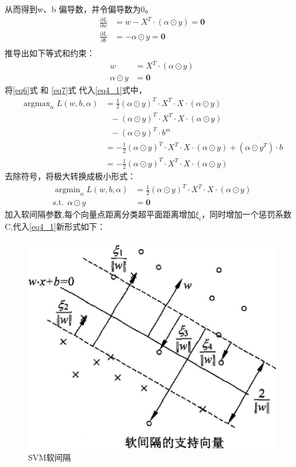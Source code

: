 \documentclass[12pt, a4paper, oneside]{ctexart}
\begin{document}
从而得到w、b 偏导数，并令偏导数为0。
\begin{align}
    \frac{\partial L}{\partial w} &= w - X^T\cdot(\alpha \odot y) = \boldsymbol{0}\nonumber \\
    \frac{\partial L}{\partial b} &= - \alpha \odot y \nonumber = \boldsymbol{0}\\
\end{align}
推导出如下等式和约束：
\begin{align}
    w &= X^T\cdot(\alpha \odot y) \label{eq6} \\
    \alpha \odot y &= \boldsymbol{0} \label{eq7}
\end{align}
将\eqref{eq6}式 和 \eqref{eq7}式 代入\eqref{eq4_1}式中，
\begin{align}
    \mathop{\arg\max}_{\alpha} L(w, b, {\alpha}) &= \frac{1}{2}(\alpha \odot y)^T \cdot X^T \cdot X \cdot (\alpha \odot y) \nonumber \\
                      & \ \ \  - (\alpha \odot y)^T \cdot X^T \cdot X \cdot (\alpha \odot y) \nonumber \\
                      & \ \ \  - (\alpha \odot y)^T \cdot b^m  \nonumber \\
                      &= -\frac{1}{2}(\alpha \odot y)^T \cdot X^T \cdot X \cdot (\alpha \odot y) + (\alpha \odot y^T) \cdot b \nonumber \\
                      &= -\frac{1}{2}(\alpha \odot y)^T \cdot X^T \cdot X \cdot (\alpha \odot y) \nonumber 
\end{align}
去除符号，将极大转换成极小形式：
\begin{align}
    \mathop{\arg\min}_{\alpha} L(w, b, {\alpha}) &= \frac{1}{2}(\alpha \odot y)^T \cdot X^T \cdot X \cdot (\alpha \odot y) \label{eq9} \\
        \mathrm{ s.t. }\ \   \alpha \odot y &= \boldsymbol{0} \nonumber 
\end{align}
加入软间隔参数,每个向量点距离分类超平面距离增加$\xi_i$，同时增加一个惩罚系数C,代入\eqref{eq4_1}新形式如下：
\begin{figure}[htbp]
    \centering
    \includegraphics[width=14cm]{svm_soft.jpg}
    \caption{SVM软间隔}\label{fig2}
\end{figure}
\end{document}

